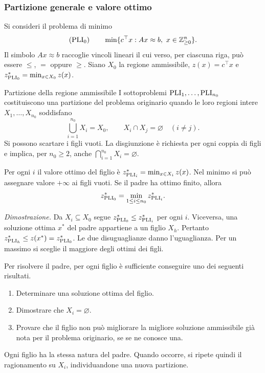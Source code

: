 \subsubsection{Partizione generale e valore ottimo}

Si consideri il problema di minimo
\[
 (\BBpli{0})\qquad \min\{c^\top x:Ax\approx b,\ x\in\mathbb Z^n_{\geq 0}\}.
\]
Il simbolo $Ax\approx b$ raccoglie vincoli lineari il cui verso, per
ciascuna riga, può essere $\leq$, $=$ oppure $\geq$. Siano $X_0$ la
regione ammissibile, $z(x)=c^\top x$ e
$z^*_{\mathrm{PLI}_{0}}=\min_{x\in X_0}z(x)$.

\begin{definition}{Partizione della regione ammissibile}
I sottoproblemi $\mathrm{PLI}_{1},\ldots,\mathrm{PLI}_{n_0}$ costituiscono una
partizione del problema originario quando le loro regioni intere
$X_1,\ldots,X_{n_0}$ soddisfano
\[
 \bigcup_{i=1}^{n_0} X_i=X_0,\qquad X_i\cap X_j=\varnothing\quad(i\ne j).
\]
Si possono scartare i figli vuoti. La disgiunzione è richiesta per ogni
coppia di figli e implica, per $n_0\geq 2$, anche
$\bigcap_{i=1}^{n_0}X_i=\varnothing$.
\end{definition}

Per ogni $i$ il valore ottimo del figlio è
$z^*_{\mathrm{PLI}_{i}}=\min_{x\in X_i}z(x)$. Nel minimo si può assegnare
valore $+\infty$ ai figli vuoti. Se il padre ha ottimo finito, allora
\[
 z^*_{\mathrm{PLI}_{0}}=\min_{1\leq i\leq n_0}z^*_{\mathrm{PLI}_{i}}.
\]

\emph{Dimostrazione.}
Da $X_i\subseteq X_0$ segue $z^*_{\mathrm{PLI}_{0}}\leq z^*_{\mathrm{PLI}_{i}}$
per ogni $i$. Viceversa, una soluzione ottima $x^*$ del padre appartiene
a un figlio $X_h$. Pertanto
$z^*_{\mathrm{PLI}_{h}}\leq z(x^*)=z^*_{\mathrm{PLI}_{0}}$. Le due disuguaglianze
danno l'uguaglianza. Per un massimo si sceglie il maggiore degli ottimi
dei figli.

Per risolvere il padre, per ogni figlio è sufficiente conseguire uno dei
seguenti risultati.
\begin{enumerate}
 \item Determinare una soluzione ottima del figlio.
 \item Dimostrare che $X_i=\varnothing$.
 \item Provare che il figlio non può migliorare la migliore soluzione
       ammissibile già nota per il problema originario, se se ne conosce una.
\end{enumerate}
Ogni figlio ha la stessa natura del padre. Quando occorre, si ripete quindi
il ragionamento su $X_i$, individuandone una nuova partizione.

